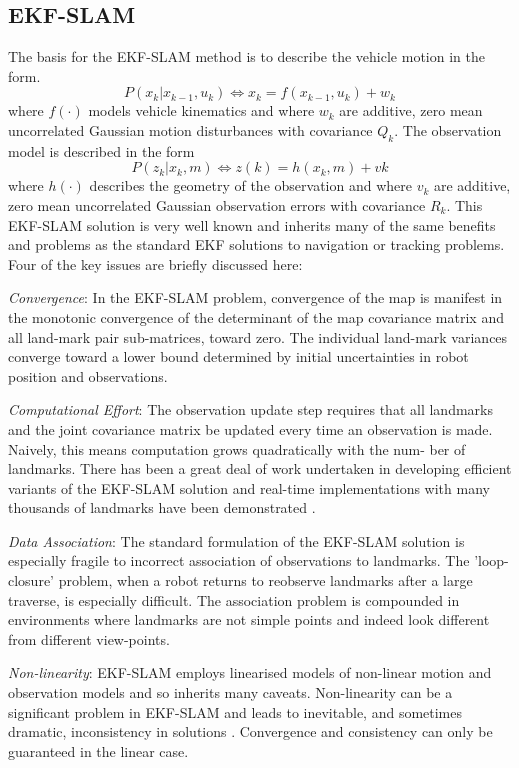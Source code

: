 \documentclass[12pt]{article}
\begin{document}
\subsection{EKF-SLAM}
The basis for the EKF-SLAM method is to describe the vehicle motion in the form.
\begin{equation}
P(x_k | x_{k-1},u_k)\iff x_k = f(x_{k−1},u_k)+w_k
\end{equation}
where $f(·)$ models vehicle kinematics and where $w_k$ are additive, zero mean uncorrelated Gaussian motion disturbances with covariance $Q_k$. The observation model is described in the form
\begin{equation}
P(z_k | x_k,m)\iff z(k) = h(x_k,m)+vk
\end{equation}
where $h(·)$ describes the geometry of the observation and where $v_k$ are additive, zero mean uncorrelated Gaussian
observation errors with covariance $R_k$.
This EKF-SLAM solution is very well known and inherits 
many of the same benefits and problems as the standard EKF solutions to navigation or tracking problems. Four of the key issues are briefly discussed here:
\par \emph{Convergence}:
 In the EKF-SLAM problem, convergence of the map is manifest in the monotonic convergence of the determinant of the map covariance matrix  and all land-mark pair sub-matrices, toward zero. The individual land-mark variances converge toward a lower bound determined by initial uncertainties in robot position and observations.
 \par \emph{Computational Effort}: The observation update step requires that all landmarks and the joint covariance matrix be updated every time an observation is made. Naively, this means computation grows quadratically with the num- ber of landmarks. There has been a great deal of work undertaken in developing efficient variants of the EKF-SLAM solution and real-time implementations with many thousands of landmarks have been demonstrated .
\par \emph{Data Association}: The standard formulation of the EKF-SLAM solution is especially fragile to incorrect association of observations to landmarks. The 'loop-closure' problem, when a robot returns to reobserve landmarks after a large traverse, is especially difficult. The association problem is compounded in environments where landmarks are not simple points and indeed look different from different view-points. 
\par \emph{Non-linearity}: EKF-SLAM employs linearised models of non-linear motion and observation models and so inherits many caveats. Non-linearity can be a significant problem in EKF-SLAM and leads to inevitable, and sometimes dramatic, inconsistency in solutions . Convergence and consistency can only be guaranteed in the linear case.
\end{document}
